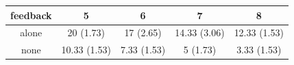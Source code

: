 \documentclass[]{article}
\begin{document}
\begin{longtable}[]{@{}ccccc@{}}
\toprule
\begin{minipage}[b]{0.13\columnwidth}\centering\strut
feedback\strut
\end{minipage} & \begin{minipage}[b]{0.18\columnwidth}\centering\strut
5\strut
\end{minipage} & \begin{minipage}[b]{0.17\columnwidth}\centering\strut
6\strut
\end{minipage} & \begin{minipage}[b]{0.18\columnwidth}\centering\strut
7\strut
\end{minipage} & \begin{minipage}[b]{0.18\columnwidth}\centering\strut
8\strut
\end{minipage}\tabularnewline
\midrule
\endhead
\begin{minipage}[t]{0.13\columnwidth}\centering\strut
alone\strut
\end{minipage} & \begin{minipage}[t]{0.18\columnwidth}\centering\strut
20 (1.73)\strut
\end{minipage} & \begin{minipage}[t]{0.17\columnwidth}\centering\strut
17 (2.65)\strut
\end{minipage} & \begin{minipage}[t]{0.18\columnwidth}\centering\strut
14.33 (3.06)\strut
\end{minipage} & \begin{minipage}[t]{0.18\columnwidth}\centering\strut
12.33 (1.53)\strut
\end{minipage}\tabularnewline
\begin{minipage}[t]{0.13\columnwidth}\centering\strut
none\strut
\end{minipage} & \begin{minipage}[t]{0.18\columnwidth}\centering\strut
10.33 (1.53)\strut
\end{minipage} & \begin{minipage}[t]{0.17\columnwidth}\centering\strut
7.33 (1.53)\strut
\end{minipage} & \begin{minipage}[t]{0.18\columnwidth}\centering\strut
5 (1.73)\strut
\end{minipage} & \begin{minipage}[t]{0.18\columnwidth}\centering\strut
3.33 (1.53)\strut
\end{minipage}\tabularnewline

\end{longtable}
\end{document}
